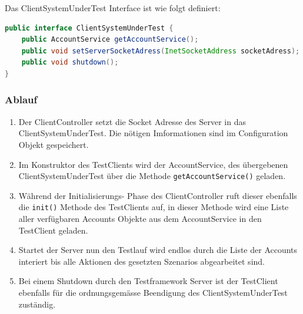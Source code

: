 Das ClientSystemUnderTest Interface ist wie folgt definiert:
\begin{lstlisting}[language=java, breaklines=true] 	
public interface ClientSystemUnderTest {	
	public AccountService getAccountService();
	public void setServerSocketAdress(InetSocketAddress socketAdress);
	public void shutdown();
}	
\end{lstlisting}
\subsubsection{Ablauf}
\label{sec:ablauf}
\begin{enumerate}
\item Der ClientController setzt die Socket Adresse des Server in das Client\-System\-Under\-Test. Die nötigen Imformationen sind im Configuration Objekt gespeichert.
\item Im Kon\-struk\-tor des Test\-Clients wird der Account\-Ser\-vice, des über\-ge\-be\-nen Client\-System\-Under\-Test über die Meth\-ode \texttt{get\allowbreak Account\allowbreak Ser\allowbreak vice()} ge\-la\-den. 
\item Während der Initialisierungs- Phase des ClientController ruft dieser ebenfalls die \verb+init()+ Methode des TestClients auf, in dieser Methode wird eine Liste aller verfügbaren Accounts Objekte aus dem AccountService in den TestClient geladen.
\item Startet der Server nun den Testlauf wird endlos durch die Liste der Accounts interiert bis alle Aktionen des gesetzten Szenarios abgearbeitet sind.
\item Bei einem Shutdown durch den Testframework Server ist der TestClient ebenfalls für die ord\-nungs\-ge\-mä\-sse Be\-en\-di\-gung des ClientSystemUnderTest zu\-stän\-dig.
\end{enumerate}

